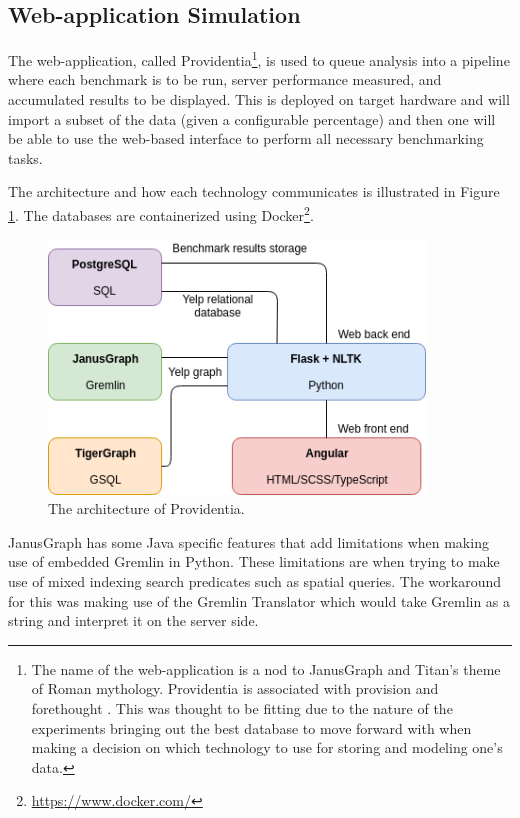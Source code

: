 \subsection{Web-application Simulation}
The web-application, called Providentia\footnote{The name of the web-application is a nod to JanusGraph and Titan's theme of Roman mythology. Providentia is associated with provision and forethought \cite{providentia-meaning}. This was thought to be fitting due to the nature of the experiments bringing out the best database to move forward with when making a decision on which technology to use for storing and modeling one's data.}, is used to queue analysis into a pipeline where each benchmark is to be run, server performance measured, and accumulated results to be displayed. This is deployed on target hardware and will import a subset of the data (given a configurable percentage) and then one will be able to use the web-based interface to perform all necessary benchmarking tasks.

The architecture and how each technology communicates is illustrated in Figure \ref{fig:providentia-architecture}. The databases are containerized using Docker\footnote{\url{https://www.docker.com/}}. 

\begin{figure}[h!]
    \centering
    \includegraphics[width=10cm]{img/providentia-architecture.png}
    \caption{The architecture of Providentia.}
    \label{fig:providentia-architecture}
\end{figure}

JanusGraph has some Java specific features that add limitations when making use of embedded 
Gremlin in Python. These limitations are when trying to make use of mixed indexing search 
predicates such as spatial queries. The workaround for this was making use of the Gremlin 
Translator which would take Gremlin as a string and interpret it on the server side.

